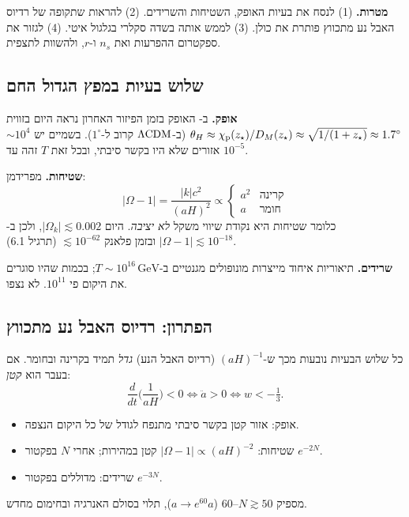 
\begin{goalbox}
\textbf{מטרות.} (1) לנסח את בעיות האופק, השטיחות והשרידים. (2) להראות שתקופה של רדיוס האבל נע מתכווץ פותרת את כולן. (3) לממש אותה בשדה סקלרי בגלגול איטי. (4) לגזור את ספקטרום ההפרעות ואת $n_s$ ו-$r$, ולהשוות לתצפית.
\end{goalbox}

\subsection{שלוש בעיות במפץ הגדול החם}
\textbf{אופק.} ב- האופק בזמן הפיזור האחרון נראה היום בזווית $\theta_H\approx\chi_{\rm p}(z_\star)/D_M(z_\star)\approx\sqrt{1/(1+z_\star)}\approx1.7^\circ$ (ב-$\Lambda\mathrm{CDM}$ קרוב ל-$1^\circ$). בשמיים יש $\sim10^4$ אזורים שלא היו בקשר סיבתי, ובכל זאת $T$ זהה עד $10^{-5}$.

\textbf{שטיחות.} מפרידמן:
\begin{equation}
|\Omega-1|=\frac{|k|c^2}{(aH)^2}\propto\begin{cases}a^2&\text{קרינה}\\ a&\text{חומר}\end{cases}
\end{equation}
כלומר שטיחות היא נקודת שיווי משקל \emph{לא יציבה}. היום $|\Omega_k|\lesssim0.002$, ולכן ב- $|\Omega-1|\lesssim10^{-18}$ ובזמן פלאנק $\lesssim10^{-62}$ (תרגיל 6.1).

\textbf{שרידים.} תיאוריות איחוד מייצרות מונופולים מגנטיים ב-$T\sim10^{16}\,\mathrm{GeV}$; בכמות שהיו סוגרים את היקום פי $10^{11}$. לא נצפו.

\subsection{הפתרון: רדיוס האבל נע מתכווץ}
כל שלוש הבעיות נובעות מכך ש-$(aH)^{-1}$ (רדיוס האבל הנע) \emph{גדל} תמיד בקרינה ובחומר. אם בעבר הוא \emph{קטן}:
\begin{equation}
\frac{d}{dt}\Big(\frac{1}{aH}\Big)<0\iff\ddot a>0\iff w<-\tfrac13 .
\end{equation}
\begin{itemize}
\item אופק: אזור קטן בקשר סיבתי מתנפח לגודל של כל היקום הנצפה.
\item שטיחות: $|\Omega-1|\propto(aH)^{-2}$ קטן במהירות; אחרי $N$  בפקטור $e^{-2N}$.
\item שרידים: מדוללים בפקטור $e^{-3N}$.
\end{itemize}
מספיק $N\gtrsim50$--$60$  ($a\to e^{60}a$), תלוי בסולם האנרגיה ובחימום מחדש.

